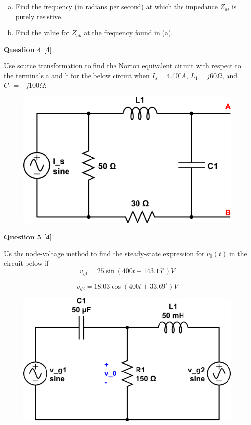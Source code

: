 \documentclass[12pt]{article}
\begin{document}
\begin{enumerate}[(a)]
\item Find the frequency (in radians per second) at which the impedance $Z_{ab}$ is purely resistive.
\item Find the value for $Z_{ab}$ at the frequency found in (a).
\end{enumerate}

\newpage


{\bf Question 4 [4]} %

Use source transformation to find the Norton equivalent circuit with respect to the terminals a and b for the below circuit when $I_s = 4 \angle 0^{\circ} A$, $L_1 = j 60 \Omega$, and $C_1 = -j 100 \Omega$:

\begin{figure}[h!]
\begin{center}
 \includegraphics[scale=0.4]{fig9_44.png}
\end{center}
\end{figure}

{\bf Question 5 [4]} %

Us the node-voltage method to find the steady-state expression for $v_0(t)$ in the circuit below if
\begin{equation}
v_{g1} = 25 \sin{(400t + 143.15^{\circ})} V
\end{equation}

\begin{equation}
v_{g2} = 18.03 \cos{(400t + 33.69^{\circ})} V
\end{equation}



\begin{figure}[h!]
\begin{center}
 \includegraphics[scale=0.4]{fig9_54.png}
\end{center}
\end{figure}
\end{document}

